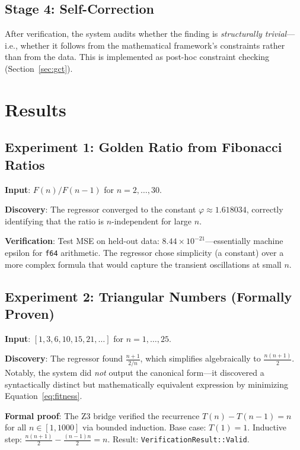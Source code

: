 \documentclass[11pt,a4paper]{article}
\begin{document}
\subsection{Stage 4: Self-Correction}

After verification, the system audits whether the finding is
\emph{structurally trivial}---i.e., whether it follows from the
mathematical framework's constraints rather than from the data. This is
implemented as post-hoc constraint checking (Section~\ref{sec:gct}).


\section{Results}
\label{sec:results}

\subsection{Experiment 1: Golden Ratio from Fibonacci Ratios}

\textbf{Input}: $F(n)/F(n{-}1)$ for $n = 2, \ldots, 30$.

\textbf{Discovery}: The regressor converged to the constant
$\varphi \approx 1.618034$, correctly identifying that the ratio is
$n$-independent for large $n$.

\textbf{Verification}: Test MSE on held-out data:
$8.44 \times 10^{-21}$---essentially machine epsilon for \texttt{f64}
arithmetic. The regressor chose simplicity (a constant) over a more
complex formula that would capture the transient oscillations at small $n$.

\subsection{Experiment 2: Triangular Numbers (Formally Proven)}

\textbf{Input}: $[1, 3, 6, 10, 15, 21, \ldots]$ for $n = 1, \ldots, 25$.

\textbf{Discovery}: The regressor found $\frac{n+1}{2/n}$, which
simplifies algebraically to $\frac{n(n+1)}{2}$. Notably, the system did
\emph{not} output the canonical form---it discovered a syntactically
distinct but mathematically equivalent expression by minimizing
Equation~\eqref{eq:fitness}.

\textbf{Formal proof}: The Z3 bridge verified the recurrence
$T(n) - T(n{-}1) = n$ for all $n \in [1, 1000]$ via bounded induction.
Base case: $T(1) = 1$. Inductive step:
$\frac{n(n+1)}{2} - \frac{(n-1)n}{2} = n$.
Result: \texttt{VerificationResult::Valid}.
\end{document}
